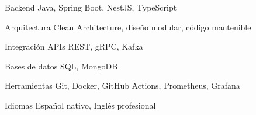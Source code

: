 

\begin{cvskills}

  \cvskill
    {Backend}
    {Java, Spring Boot, NestJS, TypeScript}

  \cvskill
    {Arquitectura}
    {Clean Architecture, diseño modular, código mantenible}

  \cvskill
    {Integración}
    {APIs REST, gRPC, Kafka}

  \cvskill
    {Bases de datos}
    {SQL, MongoDB}

  \cvskill
    {Herramientas}
    {Git, Docker, GitHub Actions, Prometheus, Grafana}

  \cvskill
    {Idiomas}
    {Español nativo, Inglés profesional}

\end{cvskills}
